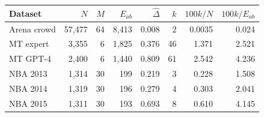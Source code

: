 \begin{tabular}{lrrrrrrr}
\toprule
Dataset & $N$ & $M$ & $E_{ab}$ & $\hat\Delta$ & $k$ & $100k/N$ & $100k/E_{ab}$ \\
\midrule
Arena crowd & 57,477 & 64 & 8,413 & 0.008 & 2 & 0.0035 & 0.024 \\
MT expert & 3,355 & 6 & 1,825 & 0.376 & 46 & 1.371 & 2.521 \\
MT GPT-4 & 2,400 & 6 & 1,440 & 0.809 & 61 & 2.542 & 4.236 \\
NBA 2013 & 1,314 & 30 & 199 & 0.219 & 3 & 0.228 & 1.508 \\
NBA 2014 & 1,319 & 30 & 196 & 0.279 & 4 & 0.303 & 2.041 \\
NBA 2015 & 1,311 & 30 & 193 & 0.693 & 8 & 0.610 & 4.145 \\
\bottomrule
\end{tabular}
